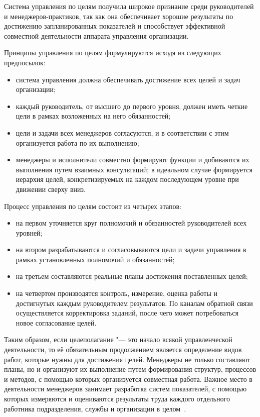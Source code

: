 \documentclass{../industrial-development}
\begin{document}
Система \alert{управления по целям} получила широкое признание среди руководителей и менеджеров-практиков, так как она обеспечивает хорошие результаты по достижению запланированных показателей и способствует эффективной совместной деятельности аппарата управления организации.

Принципы управления по целям формулируются исходя из следующих предпосылок:
 \begin{itemize}
\item система управления должна обеспечивать достижение всех целей и задач организации;
\item каждый руководитель, от высшего до первого уровня, должен иметь четкие цели в рамках возложенных на него обязанностей;
\item цели и задачи всех менеджеров согласуются, и в соответствии с этим организуется работа по их выполнению;
\item менеджеры и исполнители совместно формируют функции и добиваются их выполнения путем взаимных консультаций; в идеальном случае формируется иерархия целей, конкретизируемых на каждом последующем уровне при движении сверху вниз.
 \end{itemize}

Процесс управления по целям состоит из четырех этапов:
 \begin{itemize}
\item на первом уточняется круг полномочий и обязанностей руководителей всех уровней;
\item на втором разрабатываются и согласовываются цели и задачи управления в рамках установленных полномочий и обязанностей;
\item на третьем составляются реальные планы достижения поставленных целей;
\item на четвертом производятся контроль, измерение, оценка работы и достигнутых каждым руководителем результатов. По каналам обратной связи осуществляется корректировка заданий, после чего может потребоваться новое согласование целей.
  \end{itemize}

Таким образом, если целеполагание "--- это начало всякой управленческой деятельности, то её обязательным продолжением является определение видов работ, которые нужны для достижения целей. Менеджеры не только составляют планы, но и организуют их выполнение путем формирования структур, процессов и методов, с помощью которых организуется совместная работа. Важное место в деятельности менеджеров занимает разработка систем показателей, с помощью которых измеряются и оцениваются результаты труда каждого отдельного работника подразделения, службы и организации в целом~\cite{Rumyanceva}. 
\end{document}
